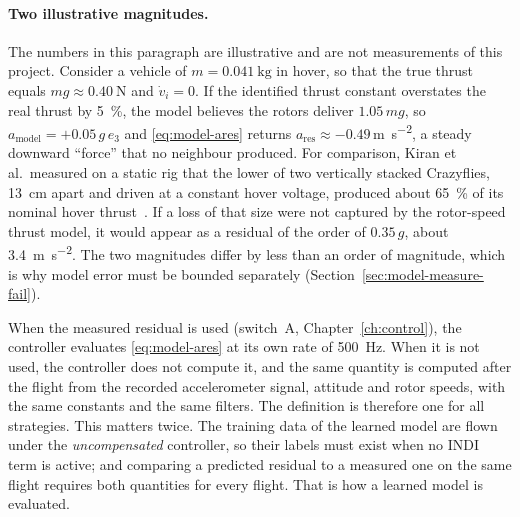\paragraph{Two illustrative magnitudes.} The numbers in this paragraph are illustrative and are
not measurements of this project. Consider a vehicle of $m = \SI{0.041}{\kilo\gram}$ in hover, so
that the true thrust equals $mg \approx \SI{0.40}{\newton}$ and $\dot v_i = 0$. If the identified
thrust constant overstates the real thrust by \SI{5}{\percent}, the model believes the rotors
deliver $1.05\,mg$, so $a_{\mathrm{model}} = +0.05\,g\,e_3$ and \eqref{eq:model-ares} returns
$a_{\mathrm{res}} \approx -0.49$\,\si{\metre\per\second\squared}, a steady downward ``force'' that
no neighbour produced. For comparison, Kiran et al.\ measured on a static rig that the lower of two
vertically stacked Crazyflies, \SI{13}{\centi\metre} apart and driven at a constant hover voltage,
produced about \SI{65}{\percent} of its nominal hover thrust~\cite{kiran2025downwash}. If a loss of
that size were not captured by the rotor-speed thrust model, it would appear as a residual of the
order of $0.35\,g$, about \SI{3.4}{\metre\per\second\squared}. The two magnitudes differ by less
than an order of magnitude, which is why model error must be bounded separately
(Section~\ref{sec:model-measure-fail}).

When the measured residual is used (switch~A, Chapter~\ref{ch:control}), the controller evaluates
\eqref{eq:model-ares} at its own rate of \SI{500}{\hertz}. When it is not used, the controller does
not compute it, and the same quantity is computed after the flight from the recorded accelerometer
signal, attitude and rotor speeds, with the same constants and the same filters. The definition is
therefore one for all strategies. This matters twice. The training data of the learned model are
flown under the \emph{uncompensated} controller, so their labels must exist when no INDI term is
active; and comparing a predicted residual to a measured one on the same flight requires both
quantities for every flight. That is how a learned model is evaluated.

